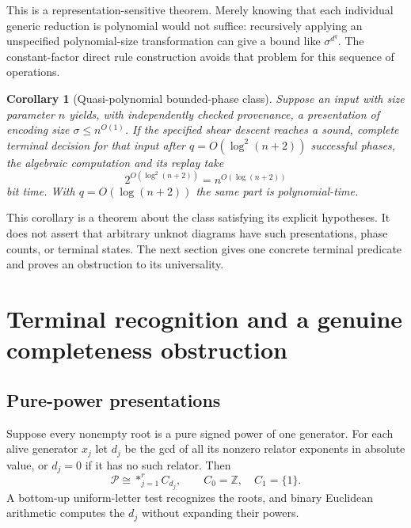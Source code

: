 \documentclass[11pt,letterpaper]{article}
\newtheorem{corollary}[theorem]{Corollary}
\theoremstyle{definition}
\theoremstyle{remark}\newtheorem{remark}[theorem]{Remark}
\newcommand{\Z}{\mathbb Z}
\newcommand{\calP}{\mathcal P}
\begin{document}
This is a representation-sensitive theorem. Merely knowing that each
individual generic reduction is polynomial would not suffice: recursively
applying an unspecified polynomial-size transformation can give a bound like
$\sigma^{d^q}$. The constant-factor direct rule construction avoids that
problem for this sequence of operations.

\begin{corollary}[Quasi-polynomial bounded-phase class]
Suppose an input with size parameter $n$ yields, with independently checked
provenance, a presentation of encoding size $\sigma\le n^{O(1)}$. If the
specified shear descent reaches a sound, complete terminal decision for that
input after $q=O(\log^2(n+2))$ successful phases, the algebraic computation and
its replay take
\[
 2^{O(\log^2(n+2))}=n^{O(\log(n+2))}
\]
bit time. With $q=O(\log(n+2))$ the same part is polynomial-time.
\end{corollary}

This corollary is a theorem about the class satisfying its explicit
hypotheses. It does not assert that arbitrary unknot diagrams have such
presentations, phase counts, or terminal states. The next section gives one
concrete terminal predicate and proves an obstruction to its universality.

\section{Terminal recognition and a genuine completeness obstruction}
\label{sec:terminal}

\subsection{Pure-power presentations}

Suppose every nonempty root is a pure signed power of one generator.
For each alive generator $x_j$ let $d_j$ be the gcd of all its nonzero
relator exponents in absolute value, or $d_j=0$ if it has no such relator.
Then
\begin{equation}
 \calP\cong \mathop{*}_{j=1}^r C_{d_j},
 \qquad C_0=\Z,\quad C_1=\{1\}.
 \label{eq:freeproduct}
\end{equation}
A bottom-up uniform-letter test recognizes the roots, and binary Euclidean
arithmetic computes the $d_j$ without expanding their powers.
\end{document}

